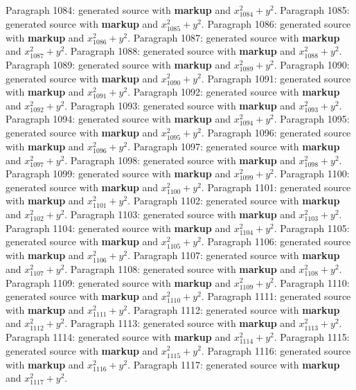 \documentclass{article}
\begin{document}
Paragraph 1084: generated source with \textbf{markup} and $x_{1084}^2 + y^2$.
Paragraph 1085: generated source with \textbf{markup} and $x_{1085}^2 + y^2$.
Paragraph 1086: generated source with \textbf{markup} and $x_{1086}^2 + y^2$.
Paragraph 1087: generated source with \textbf{markup} and $x_{1087}^2 + y^2$.
Paragraph 1088: generated source with \textbf{markup} and $x_{1088}^2 + y^2$.
Paragraph 1089: generated source with \textbf{markup} and $x_{1089}^2 + y^2$.
Paragraph 1090: generated source with \textbf{markup} and $x_{1090}^2 + y^2$.
Paragraph 1091: generated source with \textbf{markup} and $x_{1091}^2 + y^2$.
Paragraph 1092: generated source with \textbf{markup} and $x_{1092}^2 + y^2$.
Paragraph 1093: generated source with \textbf{markup} and $x_{1093}^2 + y^2$.
Paragraph 1094: generated source with \textbf{markup} and $x_{1094}^2 + y^2$.
Paragraph 1095: generated source with \textbf{markup} and $x_{1095}^2 + y^2$.
Paragraph 1096: generated source with \textbf{markup} and $x_{1096}^2 + y^2$.
Paragraph 1097: generated source with \textbf{markup} and $x_{1097}^2 + y^2$.
Paragraph 1098: generated source with \textbf{markup} and $x_{1098}^2 + y^2$.
Paragraph 1099: generated source with \textbf{markup} and $x_{1099}^2 + y^2$.
Paragraph 1100: generated source with \textbf{markup} and $x_{1100}^2 + y^2$.
Paragraph 1101: generated source with \textbf{markup} and $x_{1101}^2 + y^2$.
Paragraph 1102: generated source with \textbf{markup} and $x_{1102}^2 + y^2$.
Paragraph 1103: generated source with \textbf{markup} and $x_{1103}^2 + y^2$.
Paragraph 1104: generated source with \textbf{markup} and $x_{1104}^2 + y^2$.
Paragraph 1105: generated source with \textbf{markup} and $x_{1105}^2 + y^2$.
Paragraph 1106: generated source with \textbf{markup} and $x_{1106}^2 + y^2$.
Paragraph 1107: generated source with \textbf{markup} and $x_{1107}^2 + y^2$.
Paragraph 1108: generated source with \textbf{markup} and $x_{1108}^2 + y^2$.
Paragraph 1109: generated source with \textbf{markup} and $x_{1109}^2 + y^2$.
Paragraph 1110: generated source with \textbf{markup} and $x_{1110}^2 + y^2$.
Paragraph 1111: generated source with \textbf{markup} and $x_{1111}^2 + y^2$.
Paragraph 1112: generated source with \textbf{markup} and $x_{1112}^2 + y^2$.
Paragraph 1113: generated source with \textbf{markup} and $x_{1113}^2 + y^2$.
Paragraph 1114: generated source with \textbf{markup} and $x_{1114}^2 + y^2$.
Paragraph 1115: generated source with \textbf{markup} and $x_{1115}^2 + y^2$.
Paragraph 1116: generated source with \textbf{markup} and $x_{1116}^2 + y^2$.
Paragraph 1117: generated source with \textbf{markup} and $x_{1117}^2 + y^2$.
\end{document}
